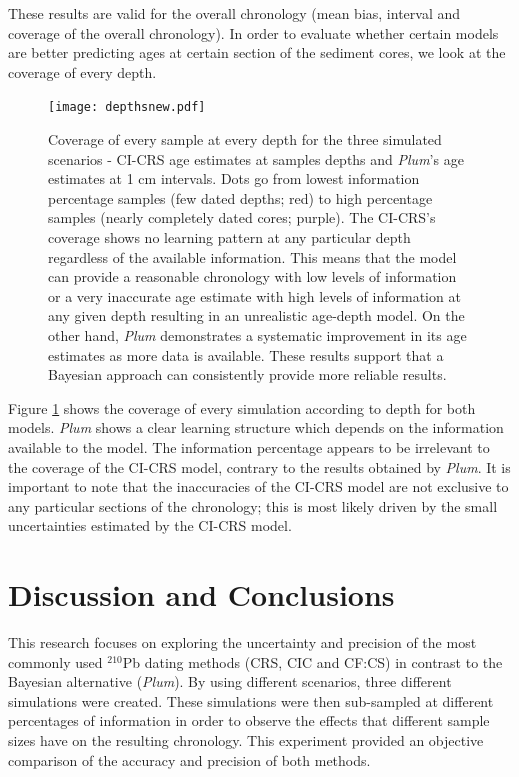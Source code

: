 \documentclass [10pt] {article}
\begin{document}
These results are valid for the overall chronology (mean bias, interval and coverage of the overall chronology). 
In order to evaluate whether certain models are better predicting ages at certain section of the sediment cores, we look at the coverage of every depth. 


\begin{figure}[!]
	\begin{centering}
		\texttt{[image: depthsnew.pdf]}
		\caption{Coverage of every sample at every depth for the three simulated scenarios - CI-CRS age estimates at samples depths and \textit{Plum}'s age estimates at 1 cm intervals. Dots go from lowest information percentage samples (few dated depths; red) to high percentage samples (nearly completely dated cores; purple). The CI-CRS's coverage shows no learning pattern at any particular depth regardless of the available information. This means that the model can provide a reasonable chronology with low levels of information or a very inaccurate age estimate with high levels of information at any given depth resulting in an unrealistic age-depth model. On the other hand, \textit{Plum} demonstrates a systematic improvement in its age estimates as more data is available. These results support that a Bayesian approach can consistently provide more reliable results.     }
		\label{fig:depths}
	\end{centering}
\end{figure}

Figure \ref{fig:depths} shows the coverage of every simulation according to depth for both models.
\textit{Plum} shows a clear learning structure which depends on the information available to the model.
The information percentage appears to be irrelevant to the coverage of the CI-CRS model, contrary to the results obtained by \textit{Plum}.
It is important to note that the inaccuracies of the CI-CRS model are not exclusive to any particular sections of the chronology; this is most likely driven by the small uncertainties estimated by the CI-CRS model.



\section{Discussion and Conclusions}

This research focuses on exploring the uncertainty and precision of the most commonly used $^{210}$Pb dating methods (CRS, CIC and CF:CS) in contrast to the Bayesian alternative (\textit{Plum}).
By using different scenarios, three different simulations were created.
These simulations were then sub-sampled at different percentages of information in order to observe the effects that different sample sizes have on the resulting chronology. 
This experiment provided an objective comparison of the accuracy and precision of both methods.
\end{document}
